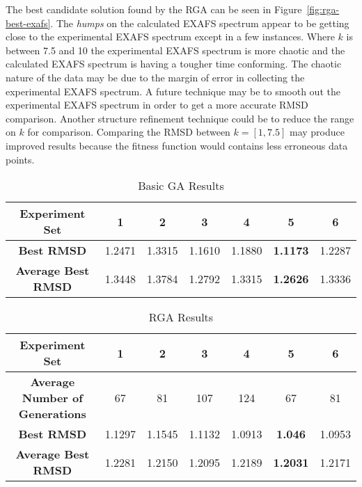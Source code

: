 The best candidate solution found by the RGA can be seen in Figure~\ref{fig:rga-best-exafs}. The \textit{humps} on the calculated EXAFS spectrum appear to be getting close to the experimental EXAFS spectrum except in a few instances. Where $k$ is between 7.5 and 10 the experimental EXAFS spectrum is more chaotic and the calculated EXAFS spectrum is having a tougher time conforming. The chaotic nature of the data may be due to the margin of error in collecting the experimental EXAFS spectrum. A future technique may be to smooth out the experimental EXAFS spectrum in order to get a more accurate RMSD comparison. Another structure refinement technique could be to reduce the range on $k$ for comparison. Comparing the RMSD between $k = [1,7.5]$ may produce improved results because the fitness function would contains less erroneous data points.


\begin{table}
	\centering
	\begin{tabular}{ | >{\bfseries}c | c | c | c | c | c | c | }
		\hline
		Experiment Set & 1 & 2 & 3 & 4 & 5 & 6 \\ \hline
		Best RMSD & 1.2471 & 1.3315 & 1.1610 & 1.1880 & \textbf{1.1173} & 1.2287 \\ \hline
		Average Best RMSD & 1.3448 & 1.3784 & 1.2792 & 1.3315 & \textbf{1.2626} & 1.3336 \\ \hline
	\end{tabular}
	\caption{Basic GA Results}
	\label{table:basic-ga-results}
\end{table}

\begin{table}
	\centering
	\begin{tabular}{ | >{\bfseries}c | c | c | c | c | c | c | }
		\hline
		Experiment Set & 1 & 2 & 3 & 4 & 5 & 6 \\ \hline
		Average Number of Generations & 67 & 81 & 107 & 124 & 67 & 81 \\ \hline
		Best RMSD & 1.1297 & 1.1545 & 1.1132 & 1.0913 & \textbf{1.046} & 1.0953 \\ \hline
		Average Best RMSD & 1.2281 & 1.2150 & 1.2095 & 1.2189 & \textbf{1.2031} & 1.2171 \\ \hline
	\end{tabular}
	\caption{RGA Results}
	\label{table:rga-results}
\end{table}

